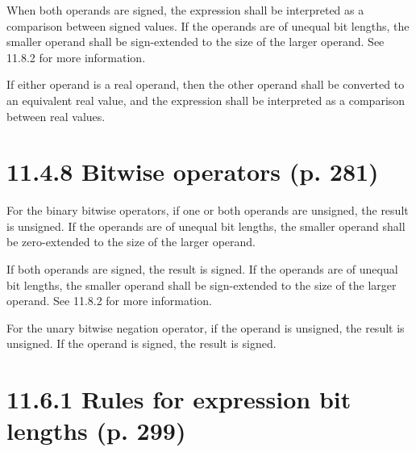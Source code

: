 \documentclass{article}
\begin{document}
When both operands are signed, the expression shall be interpreted as a
comparison between signed values.
  {
    \color{red}
    If the operands are of unequal bit
    lengths, the smaller operand shall be sign-extended to the size of the larger
    operand. See 11.8.2 for more information.
  }

If either operand is a real operand, then the other operand shall be converted
to an equivalent real value, and the expression shall be interpreted as a
comparison between real values.

\textelp{}

\section*{11.4.8 Bitwise operators (p. 281)}

\textelp{}

For the binary bitwise operators, if one or both operands are unsigned, the
result is unsigned.
  {
    \color{red}
    If the operands are of unequal bit lengths, the smaller
    operand shall be zero-extended to the size of the larger operand.
  }

If both operands are signed, the result is signed.
  {
    \color{red}
    If the operands are of
    unequal bit lengths, the smaller operand shall be sign-extended to the size of
    the larger operand. See 11.8.2 for more information.
  }

For the unary bitwise negation operator, if the operand is unsigned, the result
is unsigned. If the operand is signed, the result is signed.

\textelp{}

\section*{11.6.1 Rules for expression bit lengths (p. 299)}
\end{document}
